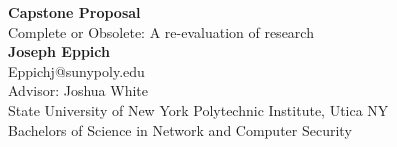 \documentclass{article}
\begin{document}
	\begin{center}
    
    
		\LARGE{\textbf{Capstone Proposal}} \\
        \vspace{1em}
        \Large{Complete or Obsolete: A re-evaluation of research} \\
        \vspace{1em}
        \normalsize\textbf{Joseph Eppich} \\
        \normalsize{Eppichj@sunypoly.edu} \\
        \vspace{1em}
        \normalsize{Advisor: Joshua White} \\
        \vspace{1em}
        \normalsize{State University of New York Polytechnic Institute, Utica NY} \\
        \normalsize{Bachelors of Science in Network and Computer Security}
     
	\end{center}
\end{document}
